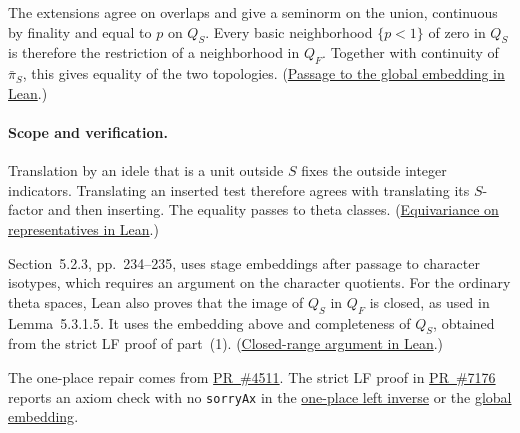 The extensions agree on overlaps and give a seminorm on the union, continuous
by finality and equal to \(p\) on \(Q_S\). Every basic neighborhood
\(\{p<1\}\) of zero in \(Q_S\) is therefore the restriction of a
neighborhood in \(Q_F\). Together with continuity of \(\bar\pi_S\), this
gives equality of the two topologies.
(\href{https://github.com/mccorvie/riemann-masullo/blob/ac7e1cde68ff1fac01ecbef3c0e9f48e46bc1f06/RiemannMasullo/Ch05_ThetaZSpaces/Sec2.lean#L2504-L2591}{Passage to the global embedding in Lean}.)

\paragraph{Scope and verification.}
Translation by an idele that is a unit
outside \(S\) fixes the outside integer indicators. Translating an inserted
test therefore agrees with translating its \(S\)-factor and then inserting.
The equality passes to theta classes.
(\href{https://github.com/mccorvie/riemann-masullo/blob/ac7e1cde68ff1fac01ecbef3c0e9f48e46bc1f06/RiemannMasullo/Ch05_ThetaZSpaces/Sec2.lean#L3174-L3183}{Equivariance on representatives in Lean}.)

Section~5.2.3, pp.~234--235, uses stage embeddings after passage to character
isotypes, which requires an argument on the character quotients. For the
ordinary theta spaces, Lean also proves that the image of \(Q_S\) in \(Q_F\)
is closed, as used in Lemma~5.3.1.5. It uses the embedding above and
completeness of \(Q_S\), obtained from the strict LF proof of part~(1).
(\href{https://github.com/mccorvie/riemann-masullo/blob/ac7e1cde68ff1fac01ecbef3c0e9f48e46bc1f06/RiemannMasullo/Ch05_ThetaZSpaces/Sec2.lean#L4210-L4221}{Closed-range argument in Lean}.)

The one-place repair comes from
\href{https://github.com/mccorvie/riemann-masullo/pull/4511}{PR~\#4511}.
The strict LF proof in
\href{https://github.com/mccorvie/riemann-masullo/pull/7176}{PR~\#7176}
reports an axiom check with no \texttt{sorryAx} in the
\href{https://github.com/mccorvie/riemann-masullo/blob/ac7e1cde68ff1fac01ecbef3c0e9f48e46bc1f06/RiemannMasullo/Ch05_ThetaZSpaces/Sec2.lean#L4128-L4132}{one-place left inverse}
or the
\href{https://github.com/mccorvie/riemann-masullo/blob/ac7e1cde68ff1fac01ecbef3c0e9f48e46bc1f06/RiemannMasullo/Ch05_ThetaZSpaces/Sec2.lean#L4205-L4208}{global embedding}.
